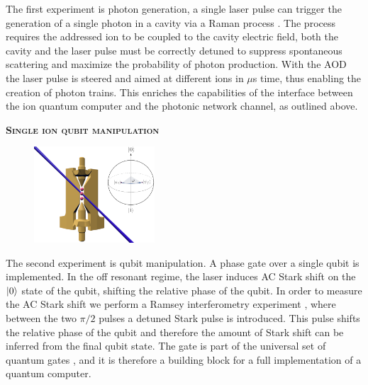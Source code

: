 \documentclass[english, a4paper, 12pt, twoside]{book}
\numberwithin{equation}{section} %
\begin{document}
The first experiment is photon generation, a single laser pulse can trigger the generation of a single photon in a cavity via a Raman process \cite{stuteinterface}. The process requires the addressed ion to be coupled to the cavity electric field,
both the cavity and the laser pulse must be correctly detuned to suppress spontaneous scattering and maximize the probability of photon production. With the AOD the laser pulse is steered and aimed at different ions in $\mu$s time, thus enabling the creation of photon trains. This enriches the capabilities of the interface between the ion quantum computer and the photonic network channel, as outlined above.\vspace{-1em}\newline
\begin{center}{\large\textbf{\textsc{Single ion qubit manipulation}}}\end{center}
\begin{figure}
  \begin{center}
    \includegraphics[width=0.4\textwidth]{qubitmanipulation2}
  \end{center}
\end{figure}
The second experiment is qubit manipulation. A phase gate \cite{chuang} over a single qubit is implemented. In the off resonant regime, the laser induces AC Stark shift on the $\ket{0}$ state of the qubit, shifting the relative phase of the qubit. In order to measure the AC Stark shift we perform a Ramsey interferometry experiment \cite{starkshift}, where between the two $\pi/2$ pulses a detuned Stark pulse is introduced. This pulse shifts the relative phase of the qubit and therefore the amount of Stark shift can be inferred from the final qubit state. The gate is part of the universal set of quantum gates \cite{chuang}, and it is therefore a building block for a full implementation of a quantum computer.
\end{document}
